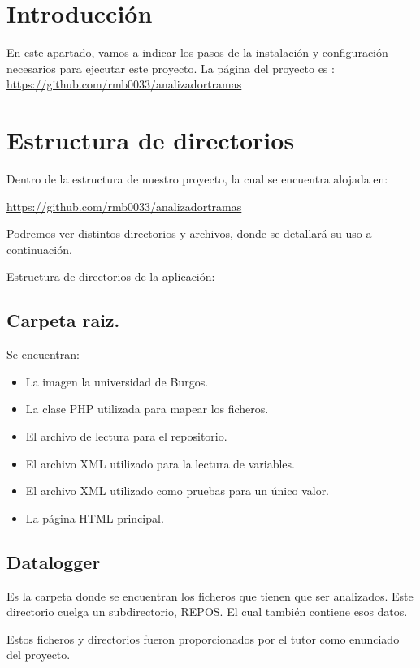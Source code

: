 

\section{Introducción}
En este apartado, vamos a indicar los pasos de la instalación y configuración necesarios para ejecutar este proyecto.
La página del proyecto es : 
\url{https://github.com/rmb0033/analizadortramas}
\section{Estructura de directorios}
Dentro de la estructura de nuestro proyecto, la cual se encuentra alojada en:

\url{https://github.com/rmb0033/analizadortramas}

Podremos ver distintos directorios y archivos, donde se detallará su uso a continuación.

Estructura de directorios de la aplicación:

\subsection{Carpeta raiz.}

Se encuentran:
\begin{itemize}
	\item La imagen la universidad de Burgos.
	\item La clase PHP utilizada para mapear los ficheros.
	\item El archivo de lectura para el repositorio.
	\item El archivo XML utilizado para la lectura de variables.
	\item El archivo XML utilizado como pruebas para un único valor.
	\item La página HTML principal.


\end{itemize}

\subsection{Datalogger} 

Es la carpeta donde se encuentran los ficheros que tienen que ser analizados. Este directorio cuelga un subdirectorio, REPOS. El cual también contiene esos datos.  

Estos ficheros y directorios fueron proporcionados por el tutor como enunciado del proyecto.

